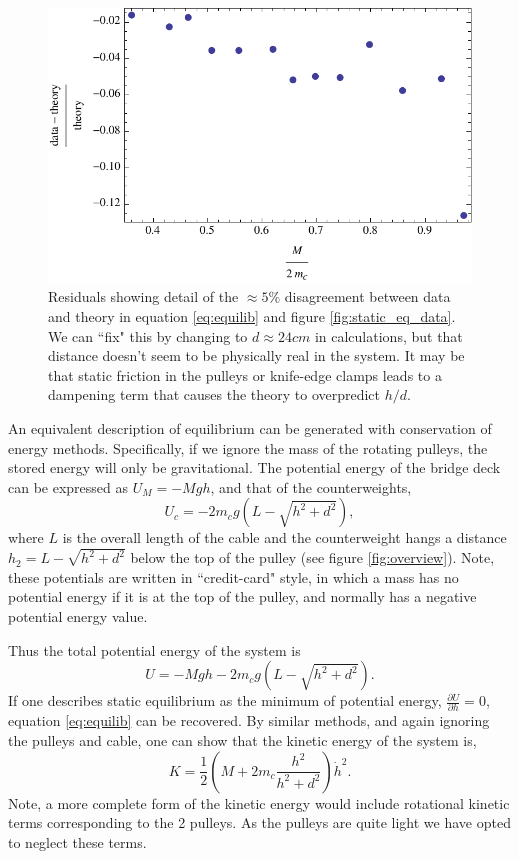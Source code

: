 \documentclass[12pt]{iopart}
\newcommand{\be}{\begin{equation}}
\newcommand{\ee}{\end{equation}}
\begin{document}
\begin{figure}[h!]
\centering
\includegraphics[width=\columnwidth]{static_residuals.pdf}  
\caption{
Residuals showing detail of the $\approx 5\%$ disagreement between data and theory in equation \ref{eq:equilib} and figure \ref{fig:static_eq_data}.  We can ``fix" this by changing to $d \approx 24cm$ in calculations, but that distance doesn't seem to be physically real in the system.  It may be that static friction in the pulleys or knife-edge clamps leads to a dampening term that causes the theory to overpredict $h/d$. 
}
\label{fig:static_eq_residuals_data}
\end{figure} 
 
An equivalent description of equilibrium can be generated with conservation of energy methods.  Specifically, if we ignore the mass of the rotating pulleys, the stored energy will only be gravitational.  The potential energy of the bridge deck can be expressed as $U_M=-M g h$, and that of the counterweights,
\be
U_c=-2 m_c g \left(L-\sqrt{h^2+d^2}\right),
\nonumber
\ee 
where $L$ is the overall length of the cable and the counterweight hangs a distance  $h_2=L-\sqrt{h^2+d^2}$ below the top of the pulley (see figure \ref{fig:overview}).  Note, these potentials are written in ``credit-card" style, in which a mass has no potential energy if it is at the top of the pulley, and normally has a negative potential energy value.

Thus the total potential energy of the system is 
\be
U=-M g h - 2 m_c g \left(L-\sqrt{h^2+d^2}\right).
\ee
If one describes static equilibrium as the minimum of potential energy, $\frac{\partial U}{\partial h}=0$, equation \ref{eq:equilib} can be recovered.  By similar methods, and again ignoring the pulleys and cable, one can show that the kinetic energy of the system is,
\be
K=\frac{1}{2}\left( M  +  2m_c  \frac{h^2}{h^2+d^2} \right) \dot{h}^2.
\ee
Note, a more complete form of the kinetic energy would include rotational kinetic terms corresponding to the 2 pulleys.  As the pulleys are quite light we have opted to neglect these terms.
\end{document}
